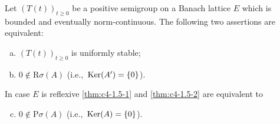 \begin{theorem}\label{thm:c4-1.5}
Let $(T(t))_{t\geq 0}$ be a positive semigroup on a Banach lattice $E$ which is bounded and eventually norm-continuous.
The following two assertions are equivalent:

\begin{enumerate}[(a)]
\item \label{thm:c4-1.5-1}
$(T(t))_{t\geq 0}$ is uniformly stable;
\item \label{thm:c4-1.5-2}
$0 \notin \text{R}{\sigma}(A)$ (i.e., $\mathop{}\mathrm{Ker}(A') = \{0\}$).
\end{enumerate}

In case $E$ is reflexive \ref{thm:c4-1.5-1} and \ref{thm:c4-1.5-2} are equivalent to

\begin{enumerate}[(a)]
\setcounter{enumi}{2}
\item  \label{thm:c4-1.5-3}
$0 \notin \text{P}\sigma(A)$ (i.e., $\mathop{}\mathrm{Ker}(A) = \{0\}$).
\end{enumerate}
\end{theorem}

